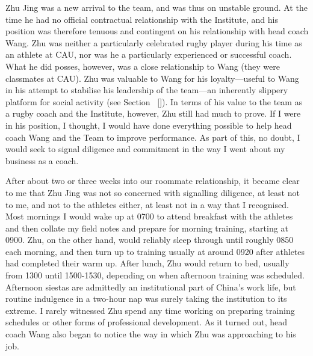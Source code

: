 \begin{CJK}{UTF8}{gbsn}
Zhu Jing was a new arrival to the team, and was thus on unstable ground. At the time he had no official contractual relationship with the Institute, and his position was therefore tenuous and contingent on his relationship with head coach Wang.  Zhu was neither a particularly celebrated rugby player during his time as an athlete at CAU, nor was he a particularly experienced or successful coach.  What he did posses, however, was a close relationship to Wang (they were classmates at CAU). Zhu was valuable to Wang for his loyalty---useful to Wang in his attempt to stabilise his leadership of the team---an inherently slippery platform for social activity (see Section ~\ref{}). In terms of his value to the team as a rugby coach and the Institute, however, Zhu still had much to prove.  If I were in his position, I thought, I would have done everything possible to help head coach Wang and the Team to improve performance.  As part of this, no doubt, I would seek to signal diligence and commitment in the way I went about my business as a coach.

After about two or three weeks into our roommate relationship, it became clear to me that Zhu Jing was not so concerned with signalling diligence, at least not to me, and not to the athletes either, at least not in a way that I recognised.  Most mornings I would wake up at 0700 to attend breakfast with the athletes and then collate my field notes and prepare for morning training, starting at 0900. Zhu, on the other hand, would reliably sleep through until roughly 0850 each morning, and then turn up to training usually at around 0920 after athletes had completed their warm up.  After lunch, Zhu would return to bed, usually from 1300 until 1500-1530, depending on when afternoon training was scheduled.  Afternoon siestas are admittedly an institutional part of China's work life, but routine indulgence in a two-hour nap was surely taking the institution to its extreme.  I rarely witnessed Zhu spend any time working on preparing training schedules or other forms of professional development.  As it turned out, head coach Wang also began to notice the way in which Zhu was approaching to his job.


\end{CJK}
